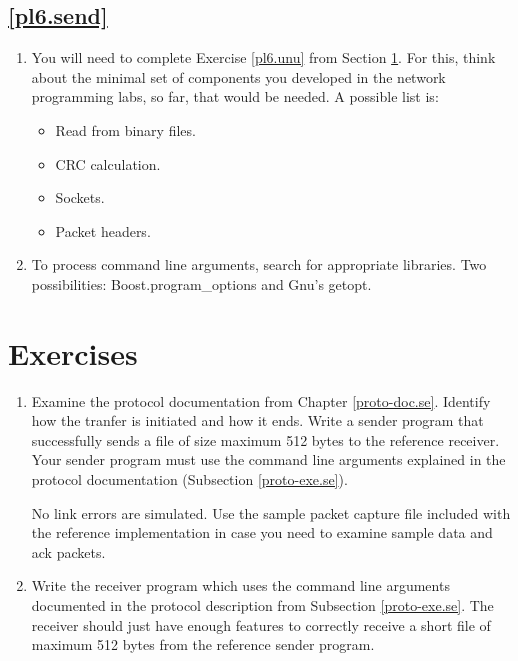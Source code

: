 \documentclass[12pt]{book}
\begin{document}
\begin{enumerate}[label=\arabic*.]
\subsection{\ref{pl6.send}}

\begin{enumerate}[resume*]
\item You will need to complete Exercise \ref*{pl6.unu} from Section \ref*{pl6.ex}. For this, think about the minimal set of components you developed in the network programming labs, so far, that would be needed. A possible list is:
  \begin{itemize}
  \item Read from binary files.
  \item CRC calculation.
  \item Sockets.
  \item Packet headers.
  \end{itemize}

\item To process command line arguments, search for appropriate libraries. Two possibilities: Boost.program\_options and Gnu's getopt.
\end{enumerate}


\section{Exercises}\label{pl6.ex}

\begin{enumerate}[label=\arabic*.]
\item \label{pl6.unu} Examine the protocol documentation from Chapter \ref{proto-doc.se}. Identify how the tranfer is initiated and how it ends. Write a sender program that successfully sends a file of size maximum 512 bytes to the reference receiver. Your sender program must use the command line arguments explained in the protocol documentation (Subsection \ref{proto-exe.se}).

  No link errors are simulated. Use the sample packet capture file included with the reference implementation in case you need to examine sample data and ack packets.

\item \label{pl6.doi} Write the receiver program which uses the command line arguments documented in the protocol description from Subsection \ref{proto-exe.se}. The receiver should just have enough features to correctly receive a short file of maximum 512 bytes from the reference sender program.


\end{enumerate}
\end{enumerate}
\end{document}
